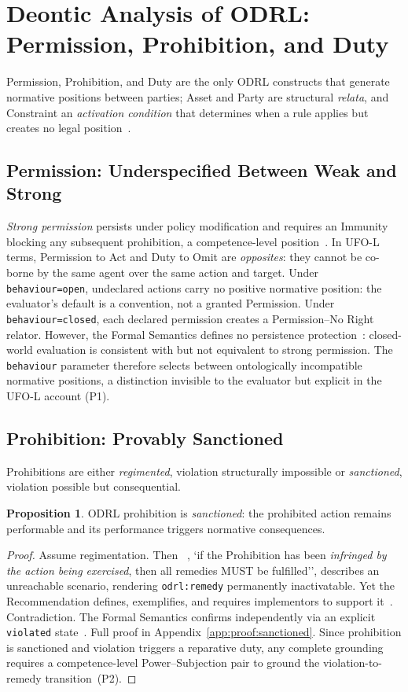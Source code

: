 \documentclass{IOS-Book-Article}
\theoremstyle{definition}
\newtheorem{proposition}{Proposition}[section]
\begin{document}
\section{Deontic Analysis of ODRL: Permission, Prohibition, and Duty}
\label{sec:classification}
Permission, Prohibition, and Duty are the only ODRL constructs
that generate normative positions between parties; Asset and Party
are structural \emph{relata}, and Constraint an \emph{activation
condition} that determines when a rule applies but creates no legal
position~\cite{iannella2018odrl}.
\subsection{Permission: Underspecified Between Weak and Strong}
\label{sec:classification:permission}
\emph{Strong permission} persists under policy modification
and requires an Immunity blocking any subsequent prohibition, a
competence-level position~\cite{griffo2023powers,alexy2010theory}.
In UFO-L terms, Permission to Act and Duty to Omit are
\emph{opposites}: they cannot be co-borne by the same agent over
the same action and target. Under \texttt{behaviour=open},
undeclared actions carry no positive normative position: the
evaluator's default is a convention, not a granted Permission.
Under \texttt{behaviour=closed}, each declared permission creates
a Permission--No Right relator. However, the Formal Semantics
defines no persistence protection~\cite{odrl-formal-semantics}:
closed-world evaluation is consistent with but not equivalent to strong permission. The \texttt{behaviour} parameter therefore selects between ontologically incompatible normative positions, a distinction invisible to the evaluator but explicit in the UFO-L account (P1).
\subsection{Prohibition: Provably Sanctioned}
\label{sec:classification:prohibition}
Prohibitions are either \emph{regimented}, violation structurally
impossible or \emph{sanctioned}, violation possible but
consequential.
\begin{proposition}
\label{prop:sanctioned}
ODRL prohibition is \emph{sanctioned}: the prohibited action remains
performable and its performance triggers normative consequences.
\end{proposition}
\begin{proof}[Proof]
Assume regimentation. Then ~\cite{iannella2018odrl}, `if the
Prohibition has been \emph{infringed by the action being exercised},
then all remedies MUST be fulfilled'', describes an unreachable
scenario, rendering \texttt{odrl:remedy} permanently inactivatable.
Yet the Recommendation defines, exemplifies, and requires implementors
to support it~\cite{iannella2018odrl}. Contradiction. The Formal
Semantics confirms independently via an explicit \texttt{violated}
state~\cite{odrl-formal-semantics}. Full proof in
Appendix~\ref{app:proof:sanctioned}. \noindent Since prohibition is sanctioned and violation triggers a
reparative duty, any complete grounding requires a competence-level
Power--Subjection pair to ground the violation-to-remedy
transition~(P2).
\end{proof}
\end{document}
